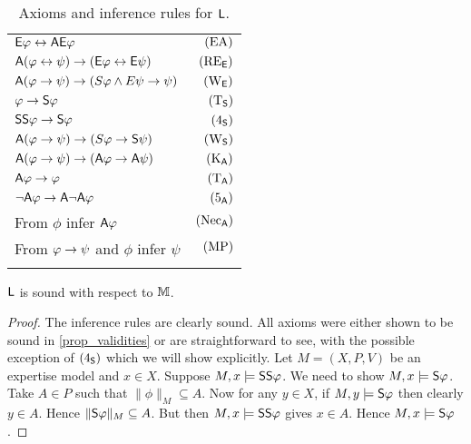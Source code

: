 \begin{table}
    \begin{center}
        \begin{minipage}{174pt}
            \caption{Axioms and inference rules for $\sL$.}
            \label{tab_axioms_general_case}
            \begin{tabular}{lr}
                \toprule
                 $\E\phi \liff \A\E\phi$
                     & $\EA$ \\
                 $\A(\phi \liff \psi) \limplies (\E\phi \liff \E\psi)$
                     & $\reE$ \\
                 $\A(\phi \limplies \psi) \limplies (S\phi \land E\psi \limplies \psi)$
                     & $\weakeningE$ \\
                 \midrule
                 $\phi \limplies \S\phi$
                     & $\Tsoundness$ \\
                 $\S\S\phi \limplies \S\phi$
                     & $\foursoundness$ \\
                 $\A(\phi \limplies \psi) \limplies (S\phi \limplies \S\psi)$
                     & $\weakeningS$ \\
                 \midrule
                 $\A(\phi \limplies \psi) \limplies (\A\phi \limplies \A\psi)$
                     & $\Kuniv$ \\
                 $\A\phi \limplies \phi$
                     & $\Tuniv$ \\
                 $\neg\A\phi \limplies \A\neg\A\phi$
                     & $\fiveuniv$ \\
                 \midrule
                 From $\phi$ infer $\A\phi$
                     & $\necuniv$ \\
                 From $\phi \limplies \psi$ and $\phi$ infer $\psi$
                     & $\modpon$ \\
                \botrule
            \end{tabular}
        \end{minipage}
    \end{center}
\end{table}

\begin{lemma}
\label{lemma_soundness_m}
    $\sL$ is sound with respect to $\M$.
\end{lemma}

\begin{proof}
    The inference rules are clearly sound. All axioms were either shown to be
    sound in \cref{prop_validities} or are straightforward to see, with the
    possible exception of $\foursoundness$ which we will show explicitly. Let
    $M = (X, P, V)$ be an expertise model and $x \in X$. Suppose $M, x \models
    \S\S\phi$. We need to show $M, x \models \S\phi$. Take $A \in P$ such that
    $\|\phi\|_M \subseteq A$. Now for any $y \in X$, if $M, y \models \S\phi$
    then clearly $y \in A$. Hence $\|\S\phi\|_M \subseteq A$. But then $M, x
    \models \S\S\phi$ gives $x \in A$. Hence $M, x \models \S\phi$.
\end{proof}

